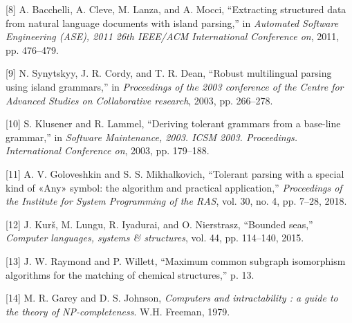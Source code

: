 \documentclass[conference,compsoc]{IEEEtran}
\begin{document}
\leavevmode\hypertarget{ref-bacchelliExtractingStructuredData2011}{}%
{[}8{]} A. Bacchelli, A. Cleve, M. Lanza, and A. Mocci, ``Extracting
structured data from natural language documents with island parsing,''
in \emph{Automated Software Engineering (ASE), 2011 26th IEEE/ACM
International Conference on}, 2011, pp. 476--479.

\leavevmode\hypertarget{ref-synytskyyRobustMultilingualParsing2003}{}%
{[}9{]} N. Synytskyy, J. R. Cordy, and T. R. Dean, ``Robust multilingual
parsing using island grammars,'' in \emph{Proceedings of the 2003
conference of the Centre for Advanced Studies on Collaborative
research}, 2003, pp. 266--278.

\leavevmode\hypertarget{ref-klusenerDerivingTolerantGrammars2003}{}%
{[}10{]} S. Klusener and R. Lammel, ``Deriving tolerant grammars from a
base-line grammar,'' in \emph{Software Maintenance, 2003. ICSM 2003.
Proceedings. International Conference on}, 2003, pp. 179--188.

\leavevmode\hypertarget{ref-goloveshkinTolerantParsingSpecial2018}{}%
{[}11{]} A. V. Goloveshkin and S. S. Mikhalkovich, ``Tolerant parsing
with a special kind of «Any» symbol: the algorithm and practical
application,'' \emph{Proceedings of the Institute for System Programming
of the RAS}, vol. 30, no. 4, pp. 7--28, 2018.

\leavevmode\hypertarget{ref-kursBoundedSeas2015}{}%
{[}12{]} J. Kurš, M. Lungu, R. Iyadurai, and O. Nierstrasz, ``Bounded
seas,'' \emph{Computer languages, systems \& structures}, vol. 44, pp.
114--140, 2015.

\leavevmode\hypertarget{ref-raymondMaximumCommonSubgraph}{}%
{[}13{]} J. W. Raymond and P. Willett, ``Maximum common subgraph
isomorphism algorithms for the matching of chemical structures,'' p. 13.

\leavevmode\hypertarget{ref-gareyComputersIntractabilityGuide1979}{}%
{[}14{]} M. R. Garey and D. S. Johnson, \emph{Computers and
intractability : a guide to the theory of NP-completeness}. W.H.
Freeman, 1979.
\end{document}
